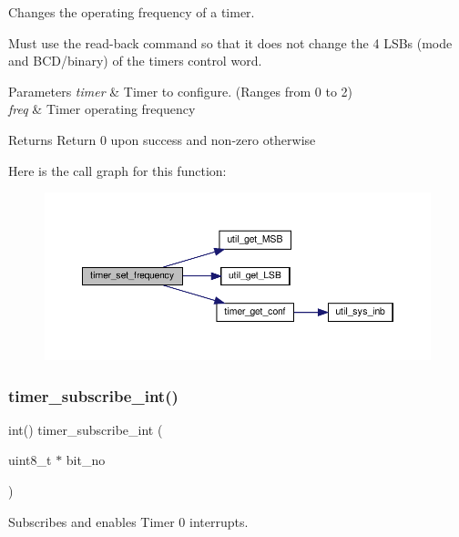 Changes the operating frequency of a timer. 

Must use the read-\/back command so that it does not change the 4 L\+S\+Bs (mode and B\+C\+D/binary) of the timer\textquotesingle{}s control word.


\begin{DoxyParams}{Parameters}
{\em timer} & Timer to configure. (Ranges from 0 to 2) \\
\hline
{\em freq} & Timer operating frequency \\
\hline
\end{DoxyParams}
\begin{DoxyReturn}{Returns}
Return 0 upon success and non-\/zero otherwise 
\end{DoxyReturn}
Here is the call graph for this function\+:\nopagebreak
\begin{figure}[H]
\begin{center}
\leavevmode
\includegraphics[width=350pt]{group__timer_gaf2c04fa8e97ffa748fd3f612886a92a7_cgraph}
\end{center}
\end{figure}
\mbox{\label{group__timer_gac57a7e1140a7e00ad95ac5488d2a671b}} 
\subsubsection{\texorpdfstring{timer\+\_\+subscribe\+\_\+int()}{timer\_subscribe\_int()}}
{\footnotesize\ttfamily int() timer\+\_\+subscribe\+\_\+int (\begin{DoxyParamCaption}\item[{uint8\+\_\+t $\ast$}]{bit\+\_\+no }\end{DoxyParamCaption})}



Subscribes and enables Timer 0 interrupts. 


